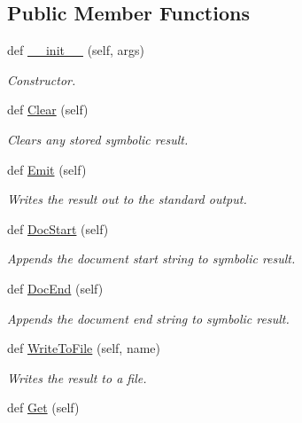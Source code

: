 \subsection*{Public Member Functions}
\begin{DoxyCompactItemize}
\item 
def \hyperlink{classSignalIntegrity_1_1SystemDescriptions_1_1Symbolic_1_1Symbolic_a08e86ba9407219234b1aac9e41d76c92}{\+\_\+\+\_\+init\+\_\+\+\_\+} (self, args)
\begin{DoxyCompactList}\small\item\em Constructor. \end{DoxyCompactList}\item 
def \hyperlink{classSignalIntegrity_1_1SystemDescriptions_1_1Symbolic_1_1Symbolic_a26d16e796dfe67359239b0e44e7f6536}{Clear} (self)
\begin{DoxyCompactList}\small\item\em Clears any stored symbolic result. \end{DoxyCompactList}\item 
def \hyperlink{classSignalIntegrity_1_1SystemDescriptions_1_1Symbolic_1_1Symbolic_a5c05a815bb2ae10666889565108aec35}{Emit} (self)
\begin{DoxyCompactList}\small\item\em Writes the result out to the standard output. \end{DoxyCompactList}\item 
def \hyperlink{classSignalIntegrity_1_1SystemDescriptions_1_1Symbolic_1_1Symbolic_ab88c31ece904e14dc6d42559745584ed}{Doc\+Start} (self)
\begin{DoxyCompactList}\small\item\em Appends the document start string to symbolic result. \end{DoxyCompactList}\item 
def \hyperlink{classSignalIntegrity_1_1SystemDescriptions_1_1Symbolic_1_1Symbolic_a91ac903754eabbc7f69d633a9304be70}{Doc\+End} (self)
\begin{DoxyCompactList}\small\item\em Appends the document end string to symbolic result. \end{DoxyCompactList}\item 
def \hyperlink{classSignalIntegrity_1_1SystemDescriptions_1_1Symbolic_1_1Symbolic_a58bef0ef4f1a5f810bd0014e5f66daf4}{Write\+To\+File} (self, name)
\begin{DoxyCompactList}\small\item\em Writes the result to a file. \end{DoxyCompactList}\item 
def \hyperlink{classSignalIntegrity_1_1SystemDescriptions_1_1Symbolic_1_1Symbolic_a4bf8a7b0df04ae9744c6946f02f1ec15}{Get} (self)
\end{DoxyCompactItemize}


